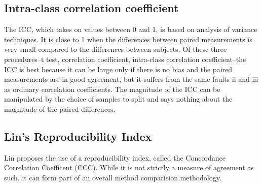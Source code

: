 	
	\subsection*{Intra-class correlation coefficient}
	
	The ICC, which takes on values between 0 and 1, is based on analysis of variance techniques. It is close to 1 when the differences between paired measurements is very small compared to the differences between subjects. Of these three procedures--t test, correlation coefficient, intra-class correlation coefficient--the ICC is best because it can be large only if there is no bias and the paired measurements are in good agreement, but it suffers from the same faults ii and iii as ordinary correlation coefficients. The magnitude of the ICC can be manipulated by the choice of samples to split and says nothing about the magnitude of the paired differences.
	
	
	\subsection{Lin's Reproducibility Index} Lin proposes the use of a
	reproducibility index, called the Concordance Correlation
	Coefficent (CCC). While it is not strictly a measure of agreement
	as such, it can form part of an overall method comparision
	methodology.
